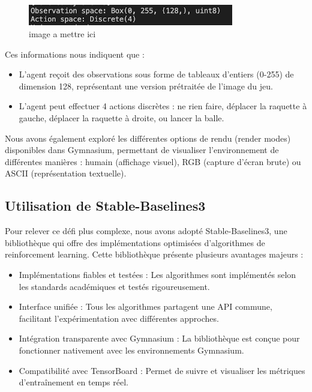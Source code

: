 \documentclass{article}
\begin{document}
\begin{figure}[ht]
    \centering
    \includegraphics[width=0.8\textwidth]{5.png}
    \caption{image a mettre ici}
\end{figure}

Ces informations nous indiquent que :
\begin{itemize} 
    \item L'agent reçoit des observations sous forme de tableaux d'entiers (0-255) de dimension 128, représentant une version prétraitée de l'image du jeu.
    \item L'agent peut effectuer 4 actions discrètes : ne rien faire, déplacer la raquette à gauche, déplacer la raquette à droite, ou lancer la balle.
\end{itemize}

Nous avons également exploré les différentes options de rendu (render modes) disponibles dans Gymnasium, permettant de visualiser l'environnement de différentes manières : humain (affichage visuel), RGB (capture d'écran brute) ou ASCII (représentation textuelle).

\subsection{Utilisation de Stable-Baselines3}

\quad Pour relever ce défi plus complexe, nous avons adopté Stable-Baselines3, une bibliothèque qui offre des implémentations optimisées d'algorithmes de reinforcement learning. Cette bibliothèque présente plusieurs avantages majeurs :
\begin{itemize} 
    \item Implémentations fiables et testées : Les algorithmes sont implémentés selon les standards académiques et testés rigoureusement.
    \item Interface unifiée : Tous les algorithmes partagent une API commune, facilitant l'expérimentation avec différentes approches.
    \item Intégration transparente avec Gymnasium : La bibliothèque est conçue pour fonctionner nativement avec les environnements Gymnasium.
    \item Compatibilité avec TensorBoard : Permet de suivre et visualiser les métriques d'entraînement en temps réel.
\end{itemize}
\end{document}
